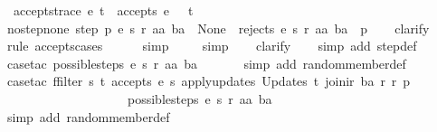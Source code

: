 \begin{isabellebody}
\ \ {\isachardoublequoteopen}accepts{\isacharunderscore}trace\ e\ t\ {\isasymequiv}\ accepts\ e\ {}\ {\isacharless}{\isachargreater}\ t{\isachardoublequoteclose}\isanewline
\isanewline
{}\isamarkupfalse%
\ no{\isacharunderscore}step{\isacharunderscore}none{\isacharcolon}\ {\isachardoublequoteopen}step\ p\ e\ s\ r\ aa\ ba\ {\isacharequal}\ None\ {\isasymLongrightarrow}\ rejects\ e\ s\ r\ {\isacharparenleft}{\isacharparenleft}aa{\isacharcomma}\ ba{\isacharparenright}\ {\isacharhash}\ p{\isacharparenright}{\isachardoublequoteclose}\isanewline
%
\isadelimproof
\ \ %
\endisadelimproof
%
\isatagproof
{}\isamarkupfalse%
\ clarify\isanewline
\ \ \isamarkupfalse%
\ {\isacharparenleft}rule\ accepts{\isachardot}cases{\isacharparenright}\isanewline
\ \ \ \ \isamarkupfalse%
\ simp\isanewline
\ \ \ \isamarkupfalse%
\ simp\isanewline
\ \ \isamarkupfalse%
\ clarify\isanewline
\ \ \isamarkupfalse%
\ {\isacharparenleft}simp\ add{\isacharcolon}\ step{\isacharunderscore}def{\isacharparenright}\isanewline
\ \ \isamarkupfalse%
\ {\isacharparenleft}case{\isacharunderscore}tac\ {\isachardoublequoteopen}{\isacharparenleft}possible{\isacharunderscore}steps\ e\ s\ r\ aa\ ba{\isacharparenright}\ {\isacharequal}\ {\isacharbraceleft}{\isacharbar}{\isacharbar}{\isacharbraceright}{\isachardoublequoteclose}{\isacharparenright}\isanewline
\ \ \ \isamarkupfalse%
\ {\isacharparenleft}simp\ add{\isacharcolon}\ random{\isacharunderscore}member{\isacharunderscore}def{\isacharparenright}\isanewline
\ \ \isamarkupfalse%
\ {\isacharparenleft}case{\isacharunderscore}tac\ {\isachardoublequoteopen}{\isacharparenleft}ffilter\ {\isacharparenleft}{\isasymlambda}{\isacharparenleft}s{\isacharprime}{\isacharcomma}\ t{\isacharparenright}{\isachardot}\ accepts\ e\ s{\isacharprime}\ {\isacharparenleft}apply{\isacharunderscore}updates\ {\isacharparenleft}Updates\ t{\isacharparenright}\ {\isacharparenleft}join{\isacharunderscore}ir\ ba\ r{\isacharparenright}\ r{\isacharparenright}\ p{\isacharparenright}\isanewline
\ \ \ \ \ \ \ \ \ \ \ \ \ \ \ \ \ \ \ \ {\isacharparenleft}possible{\isacharunderscore}steps\ e\ s\ r\ aa\ ba{\isacharparenright}{\isacharparenright}\ {\isacharequal}\ {\isacharbraceleft}{\isacharbar}{\isacharbar}{\isacharbraceright}{\isachardoublequoteclose}{\isacharparenright}\isanewline
\ \ \ \isamarkupfalse%
\ {\isacharparenleft}simp\ add{\isacharcolon}\ random{\isacharunderscore}member{\isacharunderscore}def{\isacharparenright}\isanewline

\end{isabellebody}
